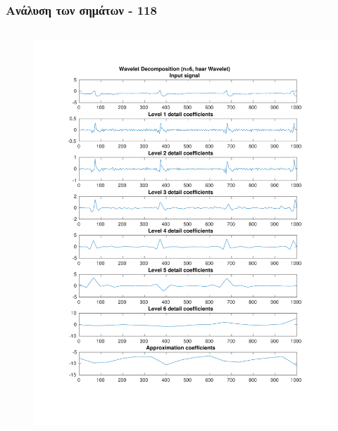 \documentclass{beamer}
\begin{document}
\begin{frame}
\frametitle{Ανάλυση των σημάτων - 118}

\begin{columns}
\begin{figure}
\includegraphics[width=\textwidth]{fig/118l1_dwt1.pdf}
\end{figure}


\end{columns}
\end{frame}
\end{document}
